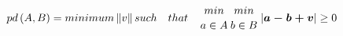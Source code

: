 \begin{equation}
 \begin{aligned}
 pd\left( A,B \right) = minimum \left\Vert v \right\Vert such \quad  that\quad  {min \atop {a \in A }} {min \atop {b \in B}} \left| \boldsymbol{a-b+v} \right|\geq0\label{eqn:pd} 
\end{aligned}
\end{equation}
